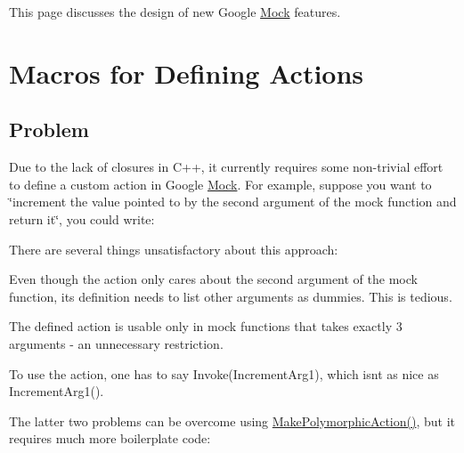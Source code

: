 This page discusses the design of new Google \mbox{\hyperlink{classMock}{Mock}} features.

\section*{Macros for Defining Actions}

\subsection*{Problem}

Due to the lack of closures in C++, it currently requires some non-\/trivial effort to define a custom action in Google \mbox{\hyperlink{classMock}{Mock}}. For example, suppose you want to \char`\"{}increment the value pointed to by the
second argument of the mock function and return it\char`\"{}, you could write\+:


\begin{DoxyCode}{0}
\DoxyCodeLine{\}}
\DoxyCodeLine{}
\end{DoxyCode}


There are several things unsatisfactory about this approach\+:


\begin{DoxyItemize}
\item Even though the action only cares about the second argument of the mock function, its definition needs to list other arguments as dummies. This is tedious.
\item The defined action is usable only in mock functions that takes exactly 3 arguments -\/ an unnecessary restriction.
\item To use the action, one has to say {\ttfamily Invoke(\+Increment\+Arg1)}, which isn\textquotesingle{}t as nice as {\ttfamily Increment\+Arg1()}.
\end{DoxyItemize}

The latter two problems can be overcome using {\ttfamily \mbox{\hyperlink{namespacetesting_a36bd06c5ea972c6df0bd9f40a7a94c65}{Make\+Polymorphic\+Action()}}}, but it requires much more boilerplate code\+:


\begin{DoxyCode}{0}
\DoxyCodeLine{  \}}
\DoxyCodeLine{\};}
\DoxyCodeLine{}
\DoxyCodeLine{\}}
\DoxyCodeLine{}
\end{DoxyCode}


